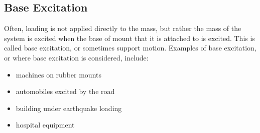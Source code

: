 \documentclass[12pt,letter]{article}
\numberwithin{ex}{section} %
\numberwithin{re}{section} %
\begin{document}
	
		\subsection{Base Excitation}

			Often, loading is not applied directly to the mass, but rather the mass of the system is excited when the base of mount that it is attached to is excited. This is called base excitation, or sometimes support motion. Examples of base excitation, or where base excitation is considered, include:
			
			\begin{itemize}
			\item machines on rubber mounts
			\item automobiles excited by the road
			\item building under earthquake loading
			\item hospital equipment
			\end{itemize}
			
\end{document}
